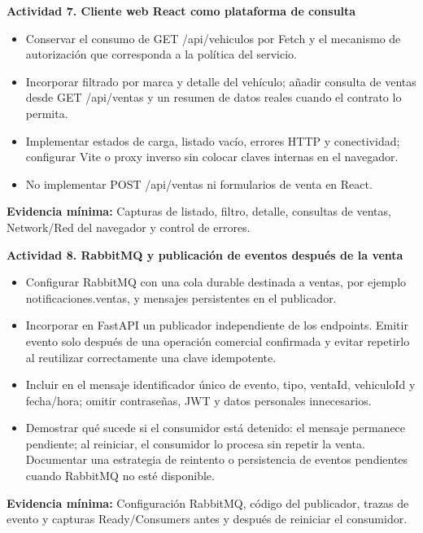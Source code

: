 \documentclass[11pt,a4paper]{article}
\renewcommand{\_}{\oldunderscore\allowbreak}
\begin{document}
\vspace{0.2cm}

\noindent\textbf{Actividad 7. Cliente web React como plataforma de consulta}
\begin{itemize}[leftmargin=*,itemsep=2pt,topsep=2pt]
  \item Conservar el consumo de GET /api/vehiculos por Fetch y el mecanismo de autorización que corresponda a la política del servicio.
  \item Incorporar filtrado por marca y detalle del vehículo; añadir consulta de ventas desde GET /api/ventas y un resumen de datos reales cuando el contrato lo permita.
  \item Implementar estados de carga, listado vacío, errores HTTP y conectividad; configurar Vite o proxy inverso sin colocar claves internas en el navegador.
  \item No implementar POST /api/ventas ni formularios de venta en React.
\end{itemize}
\textbf{Evidencia mínima:} Capturas de listado, filtro, detalle, consultas de ventas, Network/Red del navegador y control de errores.

\vspace{0.2cm}

\noindent\textbf{Actividad 8. RabbitMQ y publicación de eventos después de la venta}
\begin{itemize}[leftmargin=*,itemsep=2pt,topsep=2pt]
  \item Configurar RabbitMQ con una cola durable destinada a ventas, por ejemplo notificaciones.ventas, y mensajes persistentes en el publicador.
  \item Incorporar en FastAPI un publicador independiente de los endpoints. Emitir evento solo después de una operación comercial confirmada y evitar repetirlo al reutilizar correctamente una clave idempotente.
  \item Incluir en el mensaje identificador único de evento, tipo, ventaId, vehiculoId y fecha/hora; omitir contraseñas, JWT y datos personales innecesarios.
  \item Demostrar qué sucede si el consumidor está detenido: el mensaje permanece pendiente; al reiniciar, el consumidor lo procesa sin repetir la venta. Documentar una estrategia de reintento o persistencia de eventos pendientes cuando RabbitMQ no esté disponible.
\end{itemize}
\textbf{Evidencia mínima:} Configuración RabbitMQ, código del publicador, trazas de evento y capturas Ready/Consumers antes y después de reiniciar el consumidor.
\end{document}
